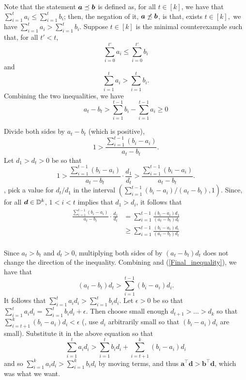 \documentclass[runningheads]{llncs}
\begin{document}
\begin{proofof}{}
Note that the statement $\boldsymbol a\preceq\boldsymbol b$ is defined as, for all $t\in[k]$, we have that $\sum_{i=1}^ta_i\leq \sum_{i=1}^tb_i$; then, the negation of it, $\boldsymbol a\not\preceq\boldsymbol b$, is that, exists $t\in[k],$ we have $\sum_{i=1}^ta_i>  \sum_{i=1}^tb_i$.
Suppose $t\in[k]$ is the minimal counterexample such that, for all $t'< t$, 
\begin{equation}\label{caseT_1}
    \sum_{i=0}^{t'}a_i\leq \sum_{i=0}^{t'}b_i
\end{equation}
and 
\begin{equation}\label{caseT}
    \sum_{i=1}^ta_i>\sum_{i=1}^tb_i.
\end{equation} 
Combining the two inequalities, we have
\begin{equation}\label{seq}
a_t -b_t>\sum_{i=1}^{t-1}b_i-\sum_{i=1}^{t-1}a_i\geq 0
\end{equation}

Divide both sides by $a_t-b_t$ (which is positive),
\begin{equation}
    1>\frac{\sum_{i=1}^{t-1}(b_i-a_i)  }{a_t-b_t}.
\end{equation}
Let $d_1 > d_t>0$ be so that 
\begin{equation}\label{equi:less than 1}
    1>\frac{\sum_{i=1}^{t-1}(b_i-a_i)  }{a_t-b_t}\cdot\frac{d_1}{d_t}> \frac{\sum_{i=1}^{t-1}(b_i-a_i)}{a_t-b_t}.
\end{equation}
\ie, pick a value for $d_t/d_1$ in the interval $( \sum_{i=1}^{t-1}(b_i-a_i)/(a_t-b_t), 1)$. 
Since, for all $\boldsymbol d\in\mathbb D^k$, $1 < i < t$ implies that $d_1 > d_i$, it follows that
\begin{equation}\label{Final_inequality}
\begin{split}
    \frac{\sum_{i=1}^{t-1}(b_i-a_i) }{a_t-b_t}\cdot\frac{d_1}{d_t}
     & = \sum_{i=1}^{t-1}\frac{(b_i-a_i)d_1}{(a_t-b_t)d_t}\\
     & \geq \sum_{i=1}^{t-1}\frac{(b_i-a_i)d_i}{(a_t-b_t)d_t}\\
\end{split}
\end{equation}

Since $a_t>b_t$ and $d_t>0$, multiplying both sides of  by $(a_t-b_t)d_t$ does not change the direction of the inequality. 
Combining  and (\ref{Final_inequality}), we have that 
$$(a_t-b_t)d_t > \sum_{i=1}^{t-1}(b_i-a_i)d_i.$$
It follows that $\sum_{i=1}^{t}a_id_i>\sum_{i=1}^{t}b_id_i$.
Let $\epsilon>0$ be so that $\sum_{i=1}^{t}a_id_i  = \sum_{i=1}^{t}b_id_i+\epsilon $. Then choose small enough $d_{t+1}>\dots> d_k$ so that $ \sum_{i=t+1}^k(b_i-a_i) d_i< \epsilon$ (\ie, use $d_i$ arbitrarily small so that $(b_i - a_i) d_i$ are small). 
Substitute it in the above equation so that $$\sum_{i=1}^{t}a_id_i >  \sum_{i=1}^{t}b_id_i + \sum_{i=t+1}^k(b_i-a_i) d_i$$ and so $ \sum_{i=1}^{k}a_id_i >  \sum_{i=1}^{k}b_id_i $ by moving terms, 
and thus $\bm a^\top \bm d> \bm b^\top \bm d$, which was what we want.
\end{proofof}
\end{document}
